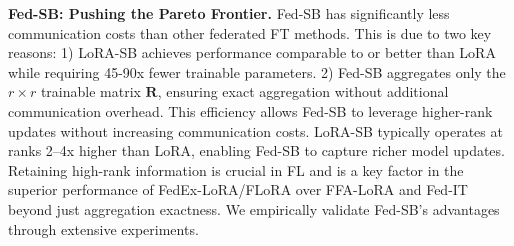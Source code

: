 \textbf{Fed-SB: Pushing the Pareto Frontier.}
Fed-SB has significantly less communication costs than other federated FT methods. This is due to two key reasons:  
1) LoRA-SB achieves performance comparable to or better than LoRA while requiring 45-90x fewer trainable parameters.  
2) Fed-SB aggregates only the \( r \times r \) trainable matrix \( \mathbf{R} \), ensuring exact aggregation without additional communication overhead.  
This efficiency allows Fed-SB to leverage higher-rank updates without increasing communication costs. 
LoRA-SB typically operates at ranks 2–4x higher than LoRA, enabling Fed-SB to capture richer model updates. 
Retaining high-rank information is crucial in FL \citep{mahla2025exploringgradientsubspacesaddressing} and is a key factor in the superior performance of FedEx-LoRA/FLoRA over FFA-LoRA and Fed-IT beyond just aggregation exactness.   
We empirically validate Fed-SB's advantages through extensive experiments.







